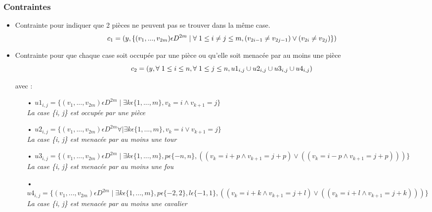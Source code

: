 \documentclass[a4paper,11pt]{article}
\begin{document}
\subsubsection{Contraintes}
\begin{itemize}
\item Contrainte pour indiquer que 2 pièces ne peuvent pas se trouver dans la même case.
   $$c_{1} = ( y, \{ (v_{1}, ..., v_{2m}) \epsilon  D^{2m} \mid \forall \hspace{0.1cm} 1\leq i \neq j \leq m, (v_{2i-1} \neq v_{2j-1}) \vee  (v_{2i} \neq v_{2j}) \} )$$ 

 \item Contrainte pour que chaque case soit occupée par une pièce ou qu'elle soit menacée par au moins une pièce
    $$c_{2} = (y, \forall \hspace{0.1cm} 1 \leq i \leq n, \forall \hspace{0.1cm} 1 \leq j \leq n,  u1_{i,j} \cup u2_{i,j} \cup u3_{i,j} \cup u4_{i,j})$$
    
    avec : \begin{itemize}
    \item[•] $u1_{i,j} = \{(v_{1}, ..., v_{2m}) \epsilon  D^{2m} \mid \exists k \epsilon \{1, ..., m\}, v_{k} = i \wedge v_{k+1} = j\}$ \\
    \textit{La case \{i, j\} est occupée par une pièce}\\
   
   
    \item[•] $u2_{i,j} = \{(v_{1}, ..., v_{2m}) \epsilon  D^{2m} \forall \mid \exists k \epsilon \{1, ..., m\}, v_{k} = i \vee v_{k+1} = j\}$ \\
    \textit{La case \{i, j\} est menacée par au moins une tour}\\
    
    
    \item[•] $u3_{i,j} = \{(v_{1}, ..., v_{2m}) \epsilon  D^{2m} \mid \exists k \epsilon \{1, ..., m\}, p \epsilon\{-n, n \}, ((v_{k} = i+p \wedge v_{k+1} = j+p) \vee ((v_{k} = i-p \wedge v_{k+1} = j+p))) \}$ \\
    \textit{La case \{i, j\} est menacée par au moins une fou}\\
    
    
    \item[•] $u4_{i,j} = \{(v_{1}, ..., v_{2m}) \epsilon  D^{2m} \mid \exists k \epsilon \{1, ..., m\}, p \epsilon \{-2, 2 \}, l \epsilon \{-1, 1\},
    ((v_{k} = i+k \wedge v_{k+1} = j+l)  \vee ((v_{k} = i+l \wedge v_{k+1} = j+k)))\}$ \\
    \textit{La case \{i, j\} est menacée par au moins une cavalier}\\
    

\end{itemize}
\end{itemize}
\end{document}
